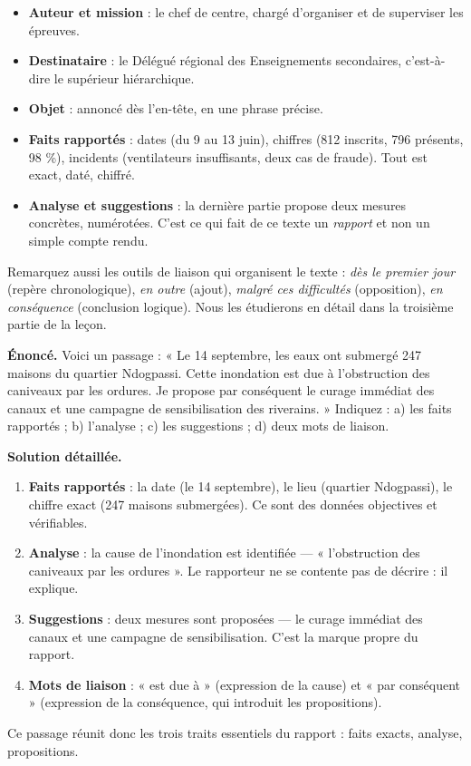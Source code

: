 \documentclass[11pt]{article}
\newcommand{\cle}[1]{{\popxbold\color{popdark}#1}}
\begin{document}
\begin{itemize}
\item \textbf{Auteur et mission} : le chef de centre, chargé d'organiser et de superviser les épreuves.
\item \textbf{Destinataire} : le Délégué régional des Enseignements secondaires, c'est-à-dire le supérieur hiérarchique.
\item \textbf{Objet} : annoncé dès l'en-tête, en une phrase précise.
\item \textbf{Faits rapportés} : dates (du 9 au 13 juin), chiffres (812 inscrits, 796 présents, 98 \%), incidents (ventilateurs insuffisants, deux cas de fraude). Tout est exact, daté, chiffré.
\item \textbf{Analyse et suggestions} : la dernière partie propose deux mesures concrètes, numérotées. C'est ce qui fait de ce texte un \emph{rapport} et non un simple compte rendu.
\end{itemize}

Remarquez aussi les \cle{outils de liaison} qui organisent le texte : \emph{dès le premier jour} (repère chronologique), \emph{en outre} (ajout), \emph{malgré ces difficultés} (opposition), \emph{en conséquence} (conclusion logique). Nous les étudierons en détail dans la troisième partie de la leçon.

\begin{exoresolu}
\textbf{Énoncé.} Voici un passage : « Le 14 septembre, les eaux ont submergé 247 maisons du quartier Ndogpassi. Cette inondation est due à l'obstruction des caniveaux par les ordures. Je propose par conséquent le curage immédiat des canaux et une campagne de sensibilisation des riverains. » Indiquez : a) les faits rapportés ; b) l'analyse ; c) les suggestions ; d) deux mots de liaison.

\tcblower
\textbf{Solution détaillée.}
\begin{enumerate}
\item \textbf{Faits rapportés} : la date (le 14 septembre), le lieu (quartier Ndogpassi), le chiffre exact (247 maisons submergées). Ce sont des données objectives et vérifiables.
\item \textbf{Analyse} : la cause de l'inondation est identifiée — « l'obstruction des caniveaux par les ordures ». Le rapporteur ne se contente pas de décrire : il explique.
\item \textbf{Suggestions} : deux mesures sont proposées — le curage immédiat des canaux et une campagne de sensibilisation. C'est la marque propre du rapport.
\item \textbf{Mots de liaison} : « est due à » (expression de la cause) et « par conséquent » (expression de la conséquence, qui introduit les propositions).
\end{enumerate}
Ce passage réunit donc les trois traits essentiels du rapport : faits exacts, analyse, propositions.
\end{exoresolu}
\end{document}
